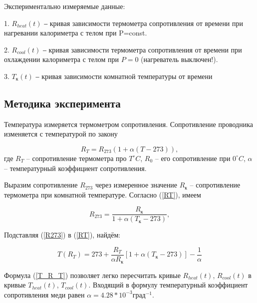 \documentclass[a4paper, 12pt]{article}
\begin{document}
            Экспериментально измеряемые данные:

                1. $R_{heat}(t)$ ‒ кривая зависимости термометра сопротивления от времени при нагревании калориметра с телом при P=const.

                2. $R_{cool}(t)$ ‒ кривая зависимости термометра сопротивления от времени при охлаждении калориметра с телом при $P = 0$ (нагреватель выключен!).

                3. $T_к(t)$ ‒ кривая зависимости комнатной температуры от времени

        \subsection{Методика эксперимента}

            Температура измеряется термометром сопротивления. Сопротивление проводника изменяется с температурой по закону

            \begin{equation}
                R_{T} = R_{273}(1 + \alpha (T - 273)),
                \label{RT}
            \end{equation}
            где $R_{T}$ -- сопротивление термометра про $T  ^{\circ}C$, $R_{0}$ -- его сопротивление при $0  ^{\circ}C$, $\alpha$ -- температурный коэффициент сопротивления.

            Выразим сопротивление $R_{273}$ через измеренное значение $R_{к}$ -- сопротивление термометра при комнатной температуре. Согласно (\ref{RT}), имеем

            \begin{equation}
                R_{273} = \frac{R_{к}}{1 + \alpha (T_к - 273)},
                \label{R273}
            \end{equation}

            Подставляя (\ref{R273}) в (\ref{RT}), найдём:

            \begin{equation}
                T(R_T) = 273 + \frac{R_T}{\alpha R_к} \left[ 1 + \alpha (T_к - 273) \right] - \frac{1}{\alpha}
                \label{T_R_T}
            \end{equation}

            Формула (\ref{T_R_T}) позволяет легко пересчитать кривые $R_{heat}(t)$, $R_{cool}(t)$ в кривые $T_{heat}(t)$, $T_{cool}(t)$. Входящий в формулу температурный коэффициент сопротивления меди равен $\alpha = 4.28*10^{-3} град^{-1}$.
\end{document}
